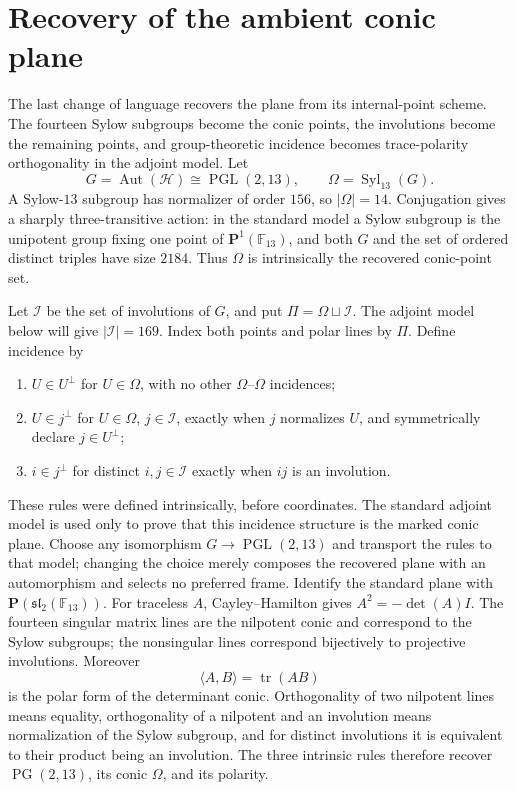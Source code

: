 \documentclass[11pt]{article}
\theoremstyle{definition}
\theoremstyle{remark}
\newcommand{\F}{\mathbb F}
\newcommand{\PG}{\operatorname{PG}}
\newcommand{\PGL}{\operatorname{PGL}}
\newcommand{\Aut}{\operatorname{Aut}}
\begin{document}
\section{Recovery of the ambient conic plane}
\label{sec:ambient-plane}

The last change of language recovers the plane from its internal-point scheme.
The fourteen Sylow subgroups become the conic points, the involutions become
the remaining points, and group-theoretic incidence becomes trace-polarity
orthogonality in the adjoint model.
Let
\[
 G=\Aut(\mathcal H)\cong\PGL(2,13),\qquad
 \Omega=\operatorname{Syl}_{13}(G).
\]
A Sylow-\(13\) subgroup has normalizer of order \(156\), so \(|\Omega|=14\).
Conjugation gives a sharply three-transitive action: in the standard model a
Sylow subgroup is the unipotent group fixing one point of
\(\mathbf P^1(\F_{13})\), and both \(G\) and the set of ordered distinct
triples have size \(2184\).  Thus \(\Omega\) is intrinsically the recovered
conic-point set.

Let \(\mathcal I\) be the set of involutions of \(G\), and put
\(\Pi=\Omega\sqcup\mathcal I\).  The adjoint model below will give
\(|\mathcal I|=169\).  Index both points and polar lines by \(\Pi\).  Define
incidence by
\begin{enumerate}[label=(\roman*)]
\item \(U\in U^\perp\) for \(U\in\Omega\), with no other
  \(\Omega\)--\(\Omega\) incidences;
\item \(U\in j^\perp\) for \(U\in\Omega\), \(j\in\mathcal I\), exactly
  when \(j\) normalizes \(U\), and symmetrically declare \(j\in U^\perp\);
\item \(i\in j^\perp\) for distinct \(i,j\in\mathcal I\) exactly when
  \(ij\) is an involution.
\end{enumerate}

These rules were defined intrinsically, before coordinates.  The standard
adjoint model is used only to prove that this incidence structure is the
marked conic plane.  Choose any isomorphism \(G\to\PGL(2,13)\) and transport
the rules to that model; changing the choice merely composes the recovered
plane with an automorphism and selects no preferred frame.  Identify the
standard plane with \(\mathbf P(\mathfrak{sl}_2(\F_{13}))\).  For traceless
\(A\), Cayley--Hamilton gives \(A^2=-\det(A)I\).  The fourteen singular
matrix lines are the nilpotent conic and correspond to the Sylow subgroups;
the nonsingular lines correspond bijectively to projective involutions.
Moreover
\[
 \langle A,B\rangle=\operatorname{tr}(AB)
\]
is the polar form of the determinant conic.  Orthogonality of two nilpotent
lines means equality, orthogonality of a nilpotent and an involution means
normalization of the Sylow subgroup, and for distinct involutions it is
equivalent to their product being an involution.  The three intrinsic rules
therefore recover \(\PG(2,13)\), its conic \(\Omega\), and its polarity.
\end{document}
